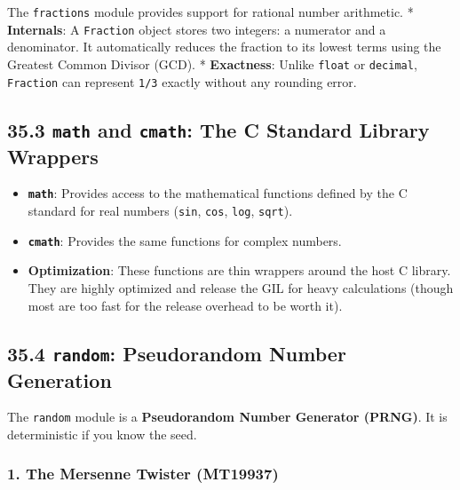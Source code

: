 The \passthrough{\lstinline!fractions!} module provides support for
rational number arithmetic. * \textbf{Internals}: A
\passthrough{\lstinline!Fraction!} object stores two integers: a
numerator and a denominator. It automatically reduces the fraction to
its lowest terms using the Greatest Common Divisor (GCD). *
\textbf{Exactness}: Unlike \passthrough{\lstinline!float!} or
\passthrough{\lstinline!decimal!}, \passthrough{\lstinline!Fraction!}
can represent \passthrough{\lstinline!1/3!} exactly without any rounding
error.

\hypertarget{math-and-cmath-the-c-standard-library-wrappers}{%
\subsection{\texorpdfstring{35.3 \texttt{math} and \texttt{cmath}: The C
Standard Library
Wrappers}{35.3 math and cmath: The C Standard Library Wrappers}}\label{math-and-cmath-the-c-standard-library-wrappers}}

\begin{itemize}
\tightlist
\item
  \textbf{\passthrough{\lstinline!math!}}: Provides access to the
  mathematical functions defined by the C standard for real numbers
  (\passthrough{\lstinline!sin!}, \passthrough{\lstinline!cos!},
  \passthrough{\lstinline!log!}, \passthrough{\lstinline!sqrt!}).
\item
  \textbf{\passthrough{\lstinline!cmath!}}: Provides the same functions
  for complex numbers.
\item
  \textbf{Optimization}: These functions are thin wrappers around the
  host C library. They are highly optimized and release the GIL for
  heavy calculations (though most are too fast for the release overhead
  to be worth it).
\end{itemize}

\hypertarget{random-pseudorandom-number-generation}{%
\subsection{\texorpdfstring{35.4 \texttt{random}: Pseudorandom Number
Generation}{35.4 random: Pseudorandom Number Generation}}\label{random-pseudorandom-number-generation}}

The \passthrough{\lstinline!random!} module is a \textbf{Pseudorandom
Number Generator (PRNG)}. It is deterministic if you know the seed.

\hypertarget{the-mersenne-twister-mt19937}{%
\subsubsection{1. The Mersenne Twister
(MT19937)}\label{the-mersenne-twister-mt19937}}


